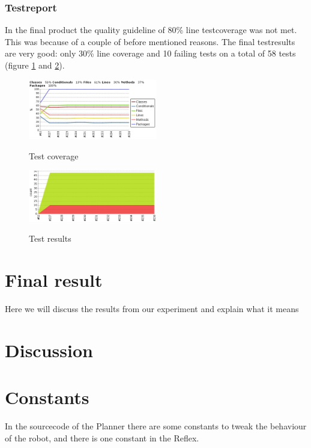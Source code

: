 \documentclass[titlepage, a4paper,10pt]{article}
\begin{document}
\subsubsection{Testreport}
In the final product the quality guideline of 80\% line testcoverage was not met. This was because of a couple of before mentioned reasons. The final testresults are very good: only 30\% line coverage and 10 failing tests on a total of 58 tests (figure \ref{fig:coverage} and \ref{fig:tests}).

\begin{figure}[h]
  \caption{Test coverage}
  \centering
    \includegraphics[width=0.5\textwidth]{coverage_graph}
  \label{fig:coverage}
\end{figure}

\begin{figure}[h]
  \caption{Test results}
  \centering
    \includegraphics[width=0.5\textwidth]{test_graph}
  \label{fig:tests}
\end{figure}

\newpage

\section{Final result}
Here we will discuss the results from our experiment and explain what it means

\newpage

\section{Discussion}


\newpage

\appendix
\appendixpage
\addappheadtotoc
\section{Constants}
In the sourcecode of the Planner there are some constants to tweak the behaviour of the robot, and there is one constant in the Reflex.
\end{document}
